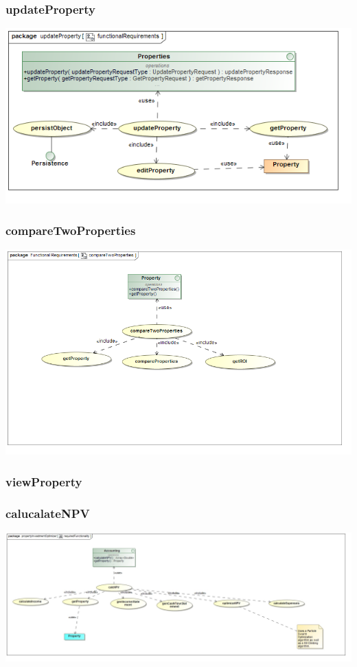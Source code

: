 \documentclass[a4paper,12pt]{article}
\begin{document}
\subsubsection{updateProperty}
\includegraphics[width=1\textwidth]{./Images/requiredFunctionality/updateProperty.png}
\subsubsection{compareTwoProperties}
\includegraphics[width=1\textwidth]{./Images/requiredFunctionality/compareTwoProperties.png}
\subsubsection{viewProperty}

\subsubsection{calucalateNPV}
\includegraphics[width=1\textwidth]{./Images/newDiagrams/requiredFunctionality/Priscilla/requiredFunctionalityNPV.jpg}
\end{document}

